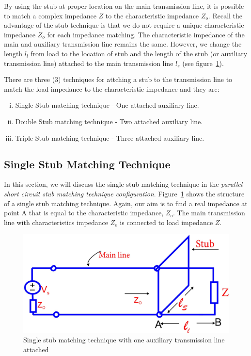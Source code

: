 By using the stub at proper location on the main transmission line, it is possible to match a complex impedance $Z$ to the characteristic impedance $Z_o$.
Recall the advantage of the stub technique is that we do not require a unique characteristic impedance $Z_o$ for each impedance matching. The characteristic impedance of the main and auxiliary transmission line remains the same. However, we change the length $l_l$ from load to the location of stub and the length of the stub (or auxiliary transmission line) attached to the main transmission line $l_s$ (see figure~\ref{fig:fig11}).

There are three (3) techniques for attching a stub to the transmission line to match the load impedance to the characteristic impedance and they are:
\begin{enumerate}[(i)]
\item Single Stub matching technique - One attached auxiliary line.
\item Double Stub matching technique - Two attached auxiliary line.
\item Triple Stub matching technique - Three attached auxiliary line.
\end{enumerate}

\subsection{Single Stub Matching Technique}
In this section, we will discuss the single stub matching technique in the \textit{parallel short circuit stub matching technique configuration}. Figure~\ref{fig:fig11} shows the structure of a single stub matching technique. Again, our aim is to find a real impedance at point A that is equal to the characteristic impedance, $Z_o$. The main transmission line with characteristics impedance $ Z_o$ is connected to load impedance $Z$.
\begin{figure}[h]
\centering
\includegraphics[width=1\linewidth]{./graphics/fig11}
\caption{Single stub matching technique with one auxiliary transmission line attached}
\label{fig:fig11}
\end{figure}

